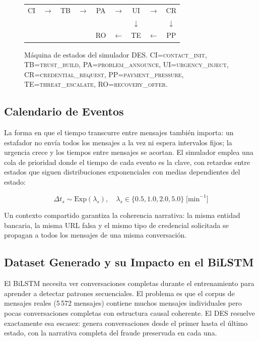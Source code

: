\documentclass{llncs}
\begin{document}
\begin{figure}[t]
\centering
\footnotesize
\setlength{\tabcolsep}{0pt}
\begin{tabular}{ccccccccc}
CI & $\to$ & TB & $\to$ & PA & $\to$ & UI & $\to$ & CR \\
   &       &    &       &    &       & $\downarrow$ & & $\downarrow$ \\
   &       &    &       & RO & $\leftarrow$ & TE & $\leftarrow$ & PP \\
\end{tabular}
\caption{Máquina de estados del simulador DES.
CI=\textsc{contact\_init}, TB=\textsc{trust\_build},
PA=\textsc{problem\_announce}, UI=\textsc{urgency\_inject},
CR=\textsc{credential\_request}, PP=\textsc{payment\_pressure},
TE=\textsc{threat\_escalate}, RO=\textsc{recovery\_offer}.}
\label{fig:fsm}
\end{figure}

\subsection{Calendario de Eventos}
\label{sec:des:calendar}

La forma en que el tiempo transcurre entre mensajes también
importa: un estafador no envía todos los mensajes a la vez
ni espera intervalos fijos; la urgencia crece y los tiempos
entre mensajes se acortan.
El simulador emplea una cola de prioridad donde el tiempo de
cada evento es la clave, con retardos entre estados que siguen
distribuciones exponenciales con medias dependientes del estado:

\begin{equation}
  \Delta t_s \sim \mathrm{Exp}(\lambda_s),
  \quad \lambda_s \in \{0.5, 1.0, 2.0, 5.0\}\;\text{[min}^{-1}]
  \label{eq:delays}
\end{equation}

Un contexto compartido garantiza la coherencia narrativa: la misma
entidad bancaria, la misma URL falsa y el mismo tipo de credencial
solicitada se propagan a todos los mensajes de una misma conversación.

\subsection{Dataset Generado y su Impacto en el BiLSTM}
\label{sec:des:dataset}

El BiLSTM necesita ver conversaciones completas durante el
entrenamiento para aprender a detectar patrones secuenciales.
El problema es que el corpus de mensajes reales (5\,572 mensajes)
contiene muchos mensajes individuales pero pocas conversaciones
completas con estructura causal coherente.
El DES resuelve exactamente esa escasez: genera conversaciones
desde el primer hasta el último estado, con la narrativa completa
del fraude preservada en cada una.
\end{document}
